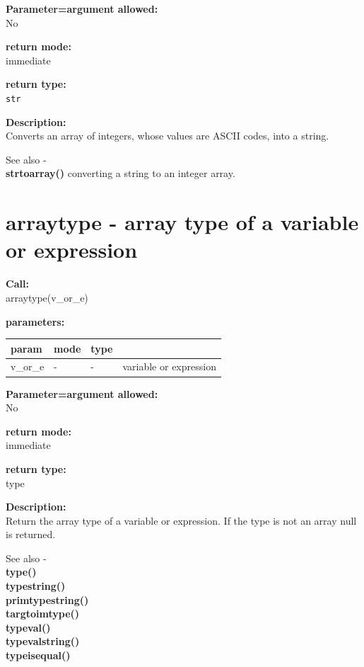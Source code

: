         {\bf Parameter=argument allowed:} \\
        No
        
        {\bf return mode:} \\
        immediate

        {\bf return type:} \\
        \verb'str'
        
        {\bf Description:} \\
        Converts an array of integers, whose values are ASCII codes,
        into a string.

        See also - \\
         {\bf strtoarray()} converting
        a string to an integer array.


    \section{arraytype - array type of a variable or expression}\label{sec:ifarraytype}
        
        {\bf Call:} \\
        arraytype(v\_or\_e)
        
        {\bf parameters:} \\
        \begin{tabular}{| l | l | l | l |}
        \hline
        param  & mode & type & \\
        \hline \hline
        v\_or\_e & - &  -  & variable or expression \\ \hline
        \end{tabular}
        
        {\bf Parameter=argument allowed:} \\
        No
        
        {\bf return mode:} \\
        immediate

        {\bf return type:} \\
        type
        
        {\bf Description:} \\
        Return the array type of a variable or expression.
        If the type is not an array null is returned.
        
        See also - \\
        {\bf type()}  \\
        {\bf typestring()}  \\
        {\bf primtypestring()}  \\
        {\bf targtoimtype()}  \\
        {\bf typeval()}  \\
        {\bf typevalstring()}  \\
        {\bf typeisequal()}  \\


